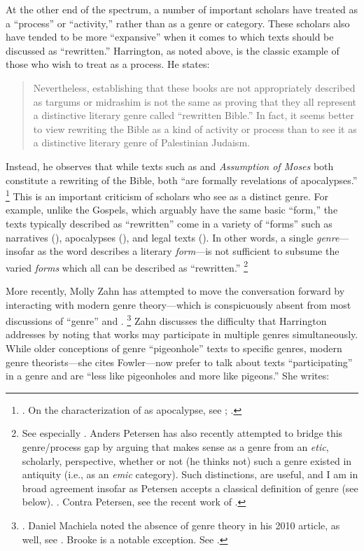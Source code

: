 At the other end of the spectrum, a number of important scholars have treated \rwb as a ``process'' or ``activity,'' rather than as a genre or category. These scholars also have tended to be more ``expansive'' when it comes to which texts should be discussed as ``rewritten.'' Harrington, as noted above, is the classic example of those who wish to treat \rwb as a process. He states: 

\begin{quote}
    Nevertheless, establishing that these books are not appropriately described as targums or midrashim is not the same as proving that they all represent a distinctive literary genre called ``rewritten Bible.'' In fact, it seems better to view rewriting the Bible as a kind of activity or process than to see it as a distinctive literary genre of Palestinian Judaism.%
    \autocite[242--243]{harrington_kraft-nickelsburg1986}
\end{quote} 
\noindent
Instead, he observes that while texts such as \jub and \emph{Assumption of Moses} both constitute a rewriting of the Bible, both ``are formally revelations of apocalypses.''%
    \footnote{%
        \Cite[243]{harrington_kraft-nickelsburg1986}. On the characterization of \jub as apocalypse, see
        \cite{collins_mason-etal2012};
        \cite{hanneken2012}.}
This is an important criticism of scholars who see \rwb as a distinct genre. For example, unlike the Gospels, which arguably have the same basic ``form,'' the texts typically described as ``rewritten'' come in a variety of ``forms'' such as narratives (\ga), apocalypses (\jub), and legal texts (\templescroll). In other words, a single \emph{genre}---insofar as the word describes a literary \emph{form}---is not sufficient to subsume the varied \emph{forms} which all can be described as ``rewritten.''%
    \footnote{%
        See especially 
        \cite{fraade_goldstein-etal2017}. Anders Petersen has also recently attempted to bridge this genre/process gap by arguing that \rwb makes sense as a genre from an \emph{etic}, scholarly, perspective, whether or not (he thinks not) such a genre existed in antiquity (i.e., as an \emph{emic} category). Such distinctions, are useful, and I am in broad agreement insofar as Petersen accepts a classical definition of genre (see below). 
        \cite{petersen_hilhorst-puech2007}. 
        Contra Petersen, see the recent work of 
        \cite{tino_jsj2018}.}

More recently, Molly Zahn has attempted to move the conversation forward by interacting with modern genre theory---which is conspicuously absent from most discussions of ``genre'' and \rwb.%
    \footnote{%
        \Cite{zahn_jbl2012}. Daniel Machiela noted the absence of genre theory in his 2010 article, as well, see 
        \cite{machiela_jjs2010}. Brooke is a notable exception. See 
        \cite{brooke_dsd2010}.}
Zahn discusses the difficulty that Harrington addresses by noting that works may participate in multiple genres simultaneously. While older conceptions of genre ``pigeonhole'' texts to specific genres, modern genre theorists---she cites Fowler---now prefer to talk about texts ``participating'' in a genre and are ``less like pigeonholes and more like pigeons.'' She writes: 

